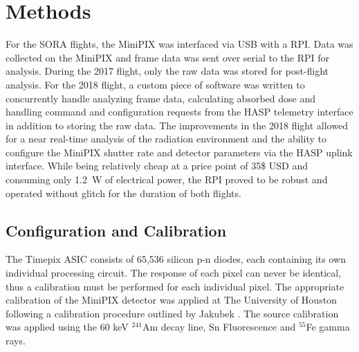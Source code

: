 \section{Methods}
\label{Methods}
For the SORA flights, the MiniPIX was interfaced via USB with a RPI. Data was collected on the MiniPIX and frame data was sent over serial to the RPI for analysis. During the 2017 flight, only the raw data was stored for post-flight analysis. For the 2018 flight, a custom piece of software was written to concurrently handle analyzing frame data, calculating absorbed dose and handling command and configuration requests from the HASP telemetry interface in addition to storing the raw data. The improvements in the 2018 flight allowed for a near real-time analysis of the radiation environment and the ability to configure the MiniPIX shutter rate and detector parameters via the HASP uplink interface. While being relatively cheap at a price point of 35\$ USD and consuming only \SI{1.2}{\watt} of electrical power, the RPI proved to be robust and operated without glitch for the duration of both flights.


\subsection{Configuration and Calibration}
The Timepix ASIC consists of 65,536 silicon p-n diodes, each containing its own individual processing circuit. The response of each pixel can never be identical, thus a calibration must be performed for each individual pixel. The appropriate calibration of the MiniPIX detector was applied at The University of Houston following a calibration procedure outlined by Jakubek \cite{mpjakubek}. The source calibration was applied using the 60 keV $^{241}$Am decay line, Sn Fluorescence and $^{55}$Fe gamma rays.

